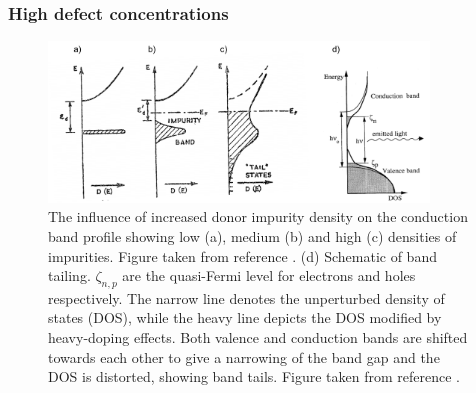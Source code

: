 \documentclass[11pt, twoside]{report}
\begin{document}
\subsubsection{High defect concentrations}

\begin{figure}[h!]
  \centering
    \includegraphics[width=0.9\textwidth]{figures/bs2+pankove.png}
    \caption[The influence of increased donor impurity density on the conduction band profile showing low (a), medium (b) and high (c) densities of impurities. (d) Schematic of band tailing. $\zeta_{n,p}$ are the quasi-Fermi level for electrons and holes respectively. The narrow line denotes the unperturbed density of states (DOS), while the heavy line depicts the DOS modified by heavy-doping effects. Both valence and conduction bands are shifted towards each other to give a narrowing of the band gap and the DOS is distorted, showing band tails.]{The influence of increased donor impurity density on the conduction band profile showing low (a), medium (b) and high (c) densities of impurities. Figure taken from reference . (d) Schematic of band tailing. $\zeta_{n,p}$ are the quasi-Fermi level for electrons and holes respectively. The narrow line denotes the unperturbed density of states (DOS), while the heavy line depicts the DOS modified by heavy-doping effects. Both valence and conduction bands are shifted towards each other to give a narrowing of the band gap and the DOS is distorted, showing band tails. Figure taken from reference .}
  \label{bs2}
\end{figure}
\end{document}
